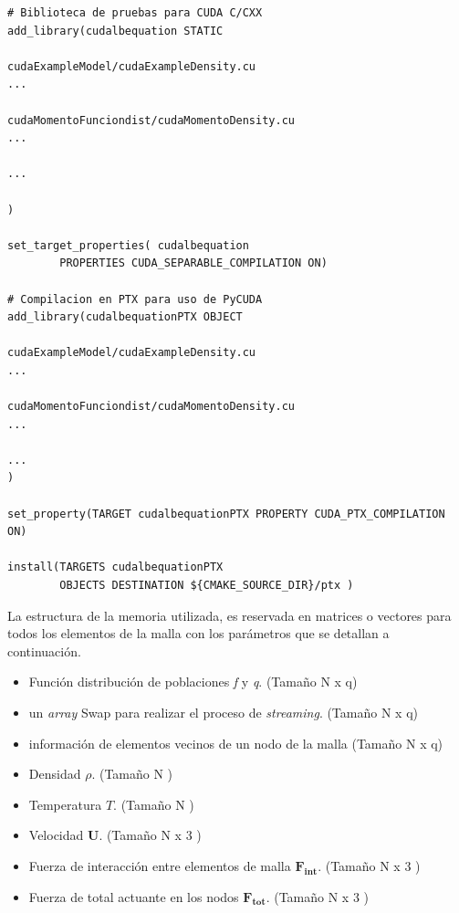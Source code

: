 \newpage
{\footnotesize
	\begin{frame}{}
		\begin{lstlisting}[frame=single]
# Biblioteca de pruebas para CUDA C/CXX
add_library(cudalbequation STATIC

cudaExampleModel/cudaExampleDensity.cu
...

cudaMomentoFunciondist/cudaMomentoDensity.cu
...

...

)

set_target_properties( cudalbequation 
		PROPERTIES CUDA_SEPARABLE_COMPILATION ON)

# Compilacion en PTX para uso de PyCUDA
add_library(cudalbequationPTX OBJECT

cudaExampleModel/cudaExampleDensity.cu
...

cudaMomentoFunciondist/cudaMomentoDensity.cu
...

...
)

set_property(TARGET cudalbequationPTX PROPERTY CUDA_PTX_COMPILATION ON)

install(TARGETS cudalbequationPTX
		OBJECTS DESTINATION ${CMAKE_SOURCE_DIR}/ptx )

		\end{lstlisting}
		
	\end{frame}
}

La estructura de la memoria utilizada, es reservada en matrices o vectores para todos los elementos de la malla con los parámetros que se detallan a continuación.

\begin{itemize}
	\item Función distribución de poblaciones \textit{f} y \textit{q}. (Tamaño N x q)
	\item un \textit{array} Swap para realizar el proceso de \textit{streaming}. (Tamaño N x q)
	\item información de elementos vecinos de un nodo de la malla (Tamaño N x q)
	\item Densidad $\rho$. (Tamaño N )
	\item Temperatura $T$. (Tamaño N )
	\item Velocidad $\mathbf{U}$. (Tamaño N x 3 )
	\item Fuerza de interacción entre elementos de malla $\mathbf{F_{int}}$. (Tamaño N x 3 )
	\item Fuerza de total actuante en los nodos $\mathbf{F_{tot}}$. (Tamaño N x 3 )
	
\end{itemize}

